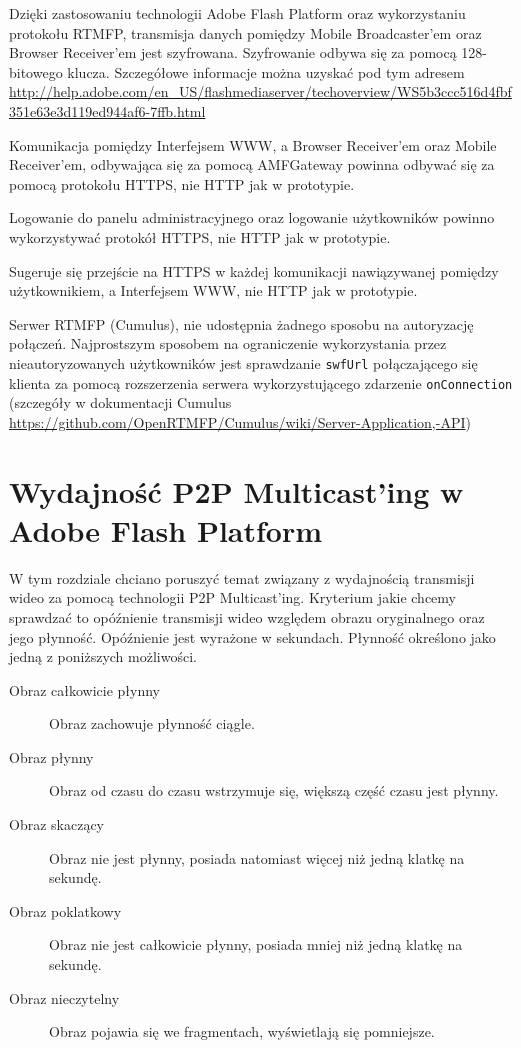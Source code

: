 \begin{packed_item}
    \item{Dzięki zastosowaniu technologii Adobe Flash Platform oraz wykorzystaniu protokołu RTMFP, transmisja danych pomiędzy Mobile Broadcaster'em oraz Browser Receiver'em jest szyfrowana. Szyfrowanie odbywa się za pomocą 128-bitowego klucza. Szczegółowe informacje można uzyskać pod tym adresem \url{http://help.adobe.com/en_US/flashmediaserver/techoverview/WS5b3ccc516d4fbf351e63e3d119ed944af6-7ffb.html}}
    \item{Komunikacja pomiędzy Interfejsem WWW, a Browser Receiver'em oraz Mobile Receiver'em, odbywająca się za pomocą AMFGateway powinna odbywać się za pomocą protokołu HTTPS, nie HTTP jak w prototypie.}
    \item{Logowanie do panelu administracyjnego oraz logowanie użytkowników powinno wykorzystywać protokół HTTPS, nie HTTP jak w prototypie.}
    \item{Sugeruje się przejście na HTTPS w każdej komunikacji nawiązywanej pomiędzy użytkownikiem, a Interfejsem WWW, nie HTTP jak w prototypie.}
    \item{Serwer RTMFP (Cumulus), nie udostępnia żadnego sposobu na autoryzację połączeń. Najprostszym sposobem na ograniczenie wykorzystania przez nieautoryzowanych użytkowników jest sprawdzanie \texttt{swfUrl} połączającego się klienta za pomocą rozszerzenia serwera wykorzystującego zdarzenie \texttt{onConnection} (szczegóły w dokumentacji Cumulus \url{https://github.com/OpenRTMFP/Cumulus/wiki/Server-Application,-API})}
\end{packed_item}

\newpage
\section{Wydajność P2P Multicast'ing w Adobe Flash Platform}

W tym rozdziale chciano poruszyć temat związany z wydajnością transmisji wideo za pomocą technologii P2P Multicast'ing. Kryterium jakie chcemy sprawdzać to opóźnienie transmisji wideo względem obrazu oryginalnego oraz jego płynność. Opóźnienie jest wyrażone w sekundach. Płynność określono jako jedną z poniższych możliwości.
\begin{description}
    \item[Obraz całkowicie płynny] Obraz zachowuje płynność ciągle.
    \item[Obraz płynny] Obraz od czasu do czasu wstrzymuje się, większą część czasu jest płynny.
    \item[Obraz skaczący] Obraz nie jest płynny, posiada natomiast więcej niż jedną klatkę na sekundę.
    \item[Obraz poklatkowy] Obraz nie jest całkowicie płynny, posiada mniej niż jedną klatkę na sekundę.
    \item[Obraz nieczytelny] Obraz pojawia się we fragmentach, wyświetlają się pomniejsze.
\end{description}

